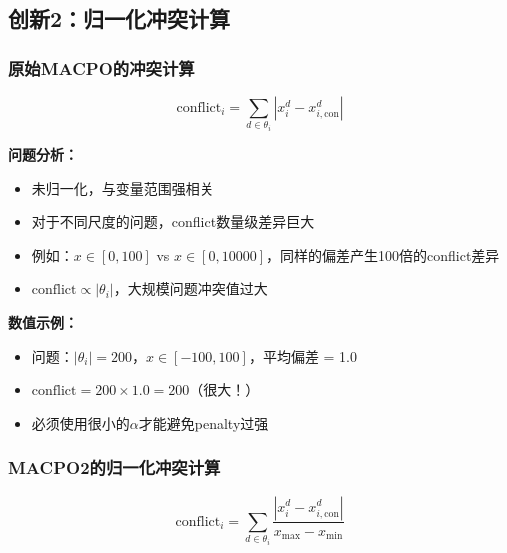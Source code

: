 \documentclass[15pt,a3paper]{ctexart}
\begin{document}
\subsection{创新2：归一化冲突计算}

\subsubsection{原始MACPO的冲突计算}

\begin{equation}
\text{conflict}_i = \sum_{d \in \theta_i} |x_i^d - x_{i,\text{con}}^d|
\end{equation}

\textbf{问题分析：}
\begin{itemize}
    \item 未归一化，与变量范围强相关
    \item 对于不同尺度的问题，conflict数量级差异巨大
    \item 例如：$x \in [0, 100]$ vs $x \in [0, 10000]$，同样的偏差产生100倍的conflict差异
    \item $\text{conflict} \propto |\theta_i|$，大规模问题冲突值过大
\end{itemize}

\textbf{数值示例：}
\begin{itemize}
    \item 问题：$|\theta_i| = 200$，$x \in [-100, 100]$，平均偏差 = 1.0
    \item $\text{conflict} = 200 \times 1.0 = 200$（很大！）
    \item 必须使用很小的$\alpha$才能避免penalty过强
\end{itemize}

\subsubsection{MACPO2的归一化冲突计算}

\begin{equation}
\text{conflict}_i= \sum_{d \in \theta_i} \frac{|x_i^d - x_{i,\text{con}}^d|}{x_{\max} - x_{\min}}
\end{equation}
\end{document}
